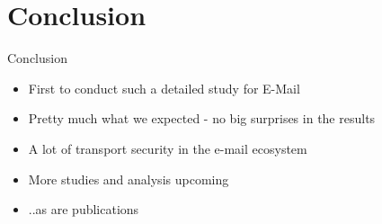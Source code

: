 \section{Conclusion}\label{conclusion}

\begin{frame}{Conclusion}

\begin{itemize}
\itemsep1pt\parskip0pt
\item
  First to conduct such a detailed study for E-Mail
\item
  Pretty much what we expected - no big surprises in the results
\item
  A lot of transport security in the e-mail ecosystem
\item
  More studies and analysis upcoming
\item
  ..as are publications
\end{itemize}

\end{frame}

